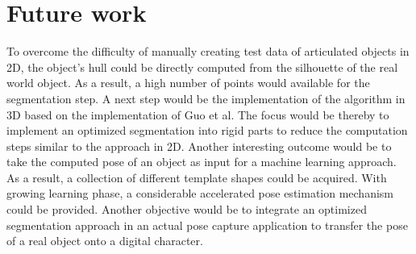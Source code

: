 \section{Future work}
\label{FutureWork}
To overcome the difficulty of manually creating test data of articulated objects in 2D, the object's hull could be directly computed from the silhouette of the real world object. As a result, a high number of points would available for the segmentation step. 
A next step would be the implementation of the algorithm in 3D based on the implementation of Guo et al. The focus would be thereby to implement an optimized segmentation into rigid parts to reduce the computation steps similar to the approach in 2D. Another interesting outcome would be to take the computed pose of an object as input for a machine learning approach. As a result, a collection of different template shapes could be acquired. With growing learning phase, a considerable accelerated pose estimation mechanism could be provided. Another objective would be to integrate an optimized segmentation approach in an actual pose capture application to transfer the pose of a real object onto a digital character.

